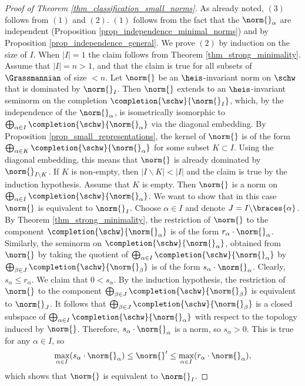 \begin{proof}[Proof of Theorem \ref{thm_classification_small_norms}]
    As already noted, $(3)$ follows from $(1)$ and $(2)$.
    $(1)$ follows from the fact that the $\norm{}_\alpha$ are independent (Proposition \ref{prop_independence_minimal_norms}) and by Proposition \ref{prop_independence_general}.
    We prove $(2)$ by induction on the size of $I$.
    When $|I|=1$ the claim follows from Theorem \ref{thm_strong_minimality}.
    Assume that $|I|=n>1$, and that the claim is true for all subsets of $\Grassmannian$ of size $<n$.
    Let $\norm{}$ be an $\heis$-invariant norm on $\schw$ that is dominated by $\norm{}_I$.
    Then $\norm{}$ extends to an $\heis$-invariant seminorm on the completion $\completion{\schw}{\norm{}_I}$, which, by the independence of the $\norm{}_\alpha$, is isometrically isomorphic to $\bigoplus_{\alpha\in I}\completion{\schw}{\norm{}_\alpha}$ via the diagonal embedding.
    By Proposition \ref{prop_small_representations}, the kernel of $\norm{}$ is of the form $\bigoplus_{\alpha\in K}\completion{\schw}{\norm{}_{\alpha}}$ for some subset $K\subset I$.
    Using the diagonal embedding, this means that $\norm{}$ is already dominated by $\norm{}_{I\backslash K}$.
    If $K$ is non-empty, then $|I\backslash K|<|I|$ and the claim is true by the induction hypothesis.
    Assume that $K$ is empty.
    Then $\norm{}$ is a norm on $\bigoplus_{\alpha\in I}\completion{\schw}{\norm{}_{\alpha}}$.
    We want to show that in this case $\norm{}$ is equivalent to $\norm{}_I$.
    Choose $\alpha\in I$ and denote $J=I\backslash\braces{\alpha}$.
    By Theorem \ref{thm_strong_minimality}, the restriction of $\norm{}$ to the component $\completion{\schw}{\norm{}_\alpha}$ is of the form $r_\alpha\cdot \norm{}_\alpha$.
    Similarly, the seminorm on $\completion{\schw}{\norm{}_\alpha}$, obtained from $\norm{}$ by taking the quotient of $\bigoplus_{\alpha\in I}\completion{\schw}{\norm{}_\alpha}$ by $\bigoplus_{\beta\in J}\completion{\schw}{\norm{}_\beta}$ is of the form $s_\alpha\cdot \norm{}_\alpha$.
    Clearly, $s_\alpha \leq r_\alpha$.
    We claim that $0<s_\alpha$.
    By the induction hypothesis, the restriction of $\norm{}$ to the component $\bigoplus_{\beta\in J}\completion{\schw}{\norm{}_\beta}$ is equivalent to $\norm{}_J$.
    It follows that $\bigoplus_{\beta\in J}\completion{\schw}{\norm{}_\beta}$ is a closed subspace of $\bigoplus_{\alpha\in I}\completion{\schw}{\norm{}_\alpha}$ with respect to the topology induced by $\norm{}$.
    Therefore, $s_\alpha\cdot \norm{}_\alpha$ is a norm, so $s_\alpha>0$.
    This is true for any $\alpha\in I$, so
    \[\max_{\alpha\in I}(s_\alpha\cdot\norm{}_\alpha)\leq\norm{}'\leq \max_{\alpha\in I}(r_\alpha\cdot\norm{}_\alpha),\] 
    which shows that $\norm{}$ is equivalent to $\norm{}_I$.
   \end{proof} 





